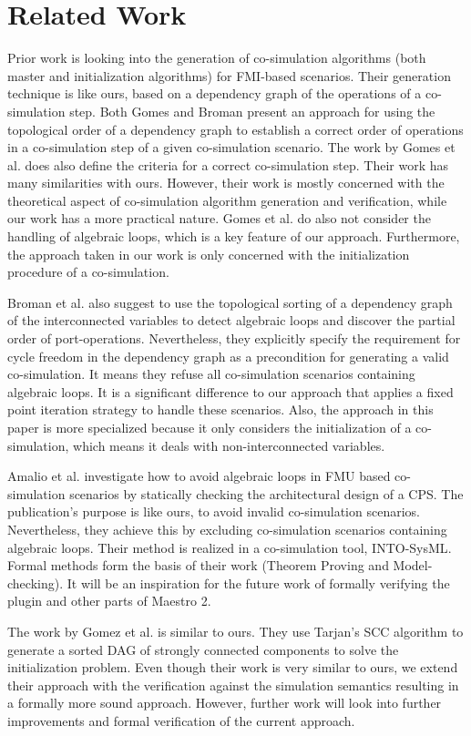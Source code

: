 \section{Related Work}
Prior work \cite{Gomes2019,Broman2013} is looking into the generation of co-simulation algorithms (both master and initialization algorithms) for FMI-based scenarios. Their generation technique is like ours, based on a dependency graph of the operations of a co-simulation step. Both Gomes and Broman present an approach for using the topological order of a dependency graph to establish a correct order of operations in a co-simulation step of a given co-simulation scenario.
The work by Gomes et al. \cite{Gomes2019} does also define the criteria for a correct co-simulation step. Their work has many similarities with ours. However, their work is mostly concerned with the theoretical aspect of co-simulation algorithm generation and verification, while our work has a more practical nature. Gomes et al. do also not consider the handling of algebraic loops, which is a key feature of our approach. Furthermore, the approach taken in our work is only concerned with the initialization procedure of a co-simulation.

Broman et al. \cite{Broman2013} also suggest to use the topological sorting of a dependency graph of the interconnected variables to detect algebraic loops and discover the partial order of port-operations. Nevertheless, they explicitly specify the requirement for cycle freedom in the dependency graph as a precondition for generating a valid co-simulation. It means they refuse all co-simulation scenarios containing algebraic loops. It is a significant difference to our approach that applies a fixed point iteration strategy to handle these scenarios. Also, the approach in this paper is more specialized because it only considers the initialization of a co-simulation, which means it deals with non-interconnected variables.

Amalio et al. \cite{Amalio2016} investigate how to avoid algebraic loops in FMU based co-simulation scenarios by statically checking the architectural design of a CPS. The publication's purpose is like ours, to avoid invalid co-simulation scenarios. Nevertheless, they achieve this by excluding co-simulation scenarios containing algebraic loops. Their method is realized in a co-simulation tool, INTO-SysML\cite{Miyazawa2016}. Formal methods form the basis of their work (Theorem Proving and Model-checking). It will be an inspiration for the future work of formally verifying the plugin and other parts of Maestro 2. 

The work by Gomez et al.\cite{EvoraGomez2019a} is similar to ours. They use Tarjan's SCC algorithm to generate a sorted DAG of strongly connected components to solve the initialization problem.
Even though their work is very similar to ours, we extend their approach with the verification against the simulation semantics resulting in a formally more sound approach. However, further work will look into further improvements and formal verification of the current approach.